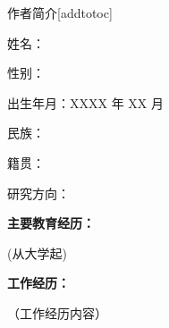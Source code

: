 
\begin{personalcv}{作者简介}[addtotoc]

姓名：

性别：

出生年月：XXXX 年 XX 月

民族：

籍贯：

研究方向：

{\bf 主要教育经历：}

(从大学起)

{\bf 工作经历：}

（工作经历内容）

\end{personalcv}



